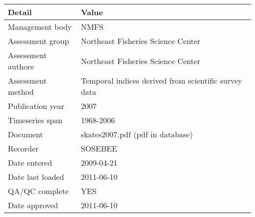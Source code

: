 \begin{table}[htb]
\centering
\begin{tabular}{lp{7cm}}
\toprule
Detail & Value \\
\midrule
Management body    & NMFS                                                 \\
Assessment group   & Northeast Fisheries Science Center                   \\
Assessment authors & Northeast Fisheries Science Center                   \\
Assessment method  & Temporal indices derived from scientific survey data \\
Publication year   & 2007                                                 \\
Timeseries span    & 1968-2006                                            \\
Document           & skates2007.pdf (pdf in database)                     \\
Recorder           & SOSEBEE                                              \\
Date entered       & 2009-04-21                                           \\
Date last loaded   & 2011-06-10                                           \\
QA/QC complete     & YES                                                  \\
Date approved      & 2011-06-10                                           \\
\bottomrule
\end{tabular}
\label{tab:assessdet}
\end{table}
